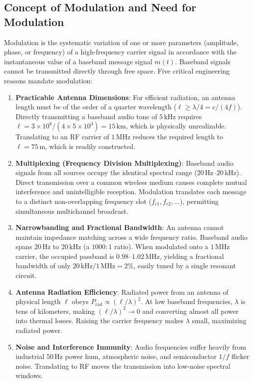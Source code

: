 \documentclass[12pt,a4paper]{article}
\begin{document}
\subsection{Concept of Modulation and Need for Modulation}
Modulation is the systematic variation of one or more parameters (amplitude, phase, or frequency) of a high-frequency carrier signal in accordance with the instantaneous value of a baseband message signal $m(t)$. Baseband signals cannot be transmitted directly through free space. Five critical engineering reasons mandate modulation:

\begin{enumerate}[leftmargin=1.5em, itemsep=3pt]
  \item \textbf{Practicable Antenna Dimensions}: For efficient radiation, an antenna length must be of the order of a quarter wavelength ($\ell \ge \lambda/4 = c/(4f)$). Directly transmitting a baseband audio tone of $5\,\mathrm{kHz}$ requires $\ell = 3\times10^8/(4\times5\times10^3) = 15\,\mathrm{km}$, which is physically unrealizable. Translating to an RF carrier of $1\,\mathrm{MHz}$ reduces the required length to $\ell = 75\,\mathrm{m}$, which is readily constructed.
  \item \textbf{Multiplexing (Frequency Division Multiplexing)}: Baseband audio signals from all sources occupy the identical spectral range ($20\,\mathrm{Hz}$--$20\,\mathrm{kHz}$). Direct transmission over a common wireless medium causes complete mutual interference and unintelligible reception. Modulation translates each message to a distinct non-overlapping frequency slot ($f_{c1}, f_{c2}, \dots$), permitting simultaneous multichannel broadcast.
  \item \textbf{Narrowbanding and Fractional Bandwidth}: An antenna cannot maintain impedance matching across a wide frequency ratio. Baseband audio spans $20\,\mathrm{Hz}$ to $20\,\mathrm{kHz}$ (a $1000:1$ ratio). When modulated onto a $1\,\mathrm{MHz}$ carrier, the occupied passband is $0.98$--$1.02\,\mathrm{MHz}$, yielding a fractional bandwidth of only $20\,\mathrm{kHz}/1\,\mathrm{MHz} = 2\%$, easily tuned by a single resonant circuit.
  \item \textbf{Antenna Radiation Efficiency}: Radiated power from an antenna of physical length $\ell$ obeys $P_{\mathrm{rad}} \propto (\ell/\lambda)^2$. At low baseband frequencies, $\lambda$ is tens of kilometers, making $(\ell/\lambda)^2 \to 0$ and converting almost all power into thermal losses. Raising the carrier frequency makes $\lambda$ small, maximizing radiated power.
  \item \textbf{Noise and Interference Immunity}: Audio frequencies suffer heavily from industrial $50\,\mathrm{Hz}$ power hum, atmospheric noise, and semiconductor $1/f$ flicker noise. Translating to RF moves the transmission into low-noise spectral windows.
\end{enumerate}
\end{document}
